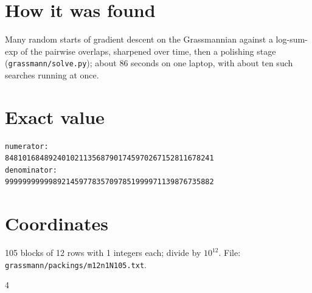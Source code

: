 \documentclass[11pt,a4paper]{article}
\begin{document}
\section{How it was found}
Many random starts of gradient descent on the Grassmannian against a log-sum-exp of the pairwise overlaps, sharpened over time, then a polishing stage (\texttt{grassmann/solve.py}); about 86 seconds on one laptop, with about ten such searches running at once.


\appendix
\section{Exact value}
{\small
\begin{verbatim}
numerator:
848101684892401021135687901745970267152811678241
denominator:
999999999998921459778357097851999971139876735882
\end{verbatim}}

\section{Coordinates}
105 blocks of 12 rows with 1 integers each; divide by $10^{12}$. File: \texttt{grassmann/packings/m12n1N105.txt}.
{\tiny
\begin{multicols}{4}
\end{multicols}}
\end{document}
